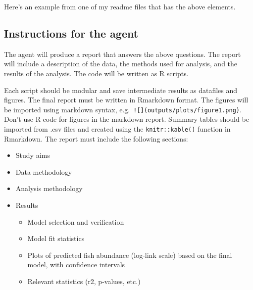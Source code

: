 \documentclass[
  letterpaper,
  DIV=11,
  numbers=noendperiod]{scrreprt}
\providecommand{\tightlist}{%
  \setlength{\itemsep}{0pt}\setlength{\parskip}{0pt}}\usepackage{longtable,booktabs,array}
\begin{document}
Here's an example from one of my readme files that has the above
elements.

\begin{tcolorbox}[enhanced jigsaw, coltitle=black, breakable, toptitle=1mm, titlerule=0mm, bottomtitle=1mm, colframe=quarto-callout-note-color-frame, left=2mm, leftrule=.75mm, title=\textcolor{quarto-callout-note-color}{\faInfo}\hspace{0.5em}{Instructions for the agent}, opacityback=0, colback=white, opacitybacktitle=0.6, bottomrule=.15mm, arc=.35mm, rightrule=.15mm, toprule=.15mm, colbacktitle=quarto-callout-note-color!10!white]

\section{Instructions for the agent}\label{instructions-for-the-agent-1}

The agent will produce a report that answers the above questions. The
report will include a description of the data, the methods used for
analysis, and the results of the analysis. The code will be written as R
scripts.

Each script should be modular and save intermediate results as datafiles
and figures. The final report must be written in Rmarkdown format. The
figures will be imported using markdown syntax,
e.g.~\texttt{!{[}{]}(outputs/plots/figure1.png)}. Don't use R code for
figures in the markdown report. Summary tables should be imported from
.csv files and created using the \texttt{knitr::kable()} function in
Rmarkdown. The report must include the following sections:

\begin{itemize}
\tightlist
\item
  Study aims
\item
  Data methodology
\item
  Analysis methodology
\item
  Results

  \begin{itemize}
  \tightlist
  \item
    Model selection and verification
  \item
    Model fit statistics
  \item
    Plots of predicted fish abundance (log-link scale) based on the
    final model, with confidence intervals
  \item
    Relevant statistics (r2, p-values, etc.)
  \end{itemize}
\end{itemize}


\end{tcolorbox}
\end{document}
